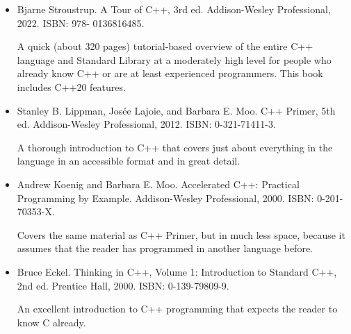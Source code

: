 \begin{itemize}
\item
Bjarne Stroustrup. A Tour of C++, 3rd ed. Addison-Wesley Professional, 2022. ISBN: 978- 0136816485.

A quick (about 320 pages) tutorial-based overview of the entire C++ language and Standard Library at a moderately high level for people who already know C++ or are at least experienced programmers. This book includes C++20 features.

\item
Stanley B. Lippman, Josée Lajoie, and Barbara E. Moo. C++ Primer, 5th ed. Addison-Wesley Professional, 2012. ISBN: 0-321-71411-3.

A thorough introduction to C++ that covers just about everything in the language in an accessible format and in great detail.

\item
Andrew Koenig and Barbara E. Moo. Accelerated C++: Practical Programming by Example. Addison-Wesley Professional, 2000. ISBN: 0-201-70353-X.

Covers the same material as C++ Primer, but in much less space, because it assumes that the reader has programmed in another language before.

\item
Bruce Eckel. Thinking in C++, Volume 1: Introduction to Standard C++, 2nd ed. Prentice Hall, 2000. ISBN: 0-139-79809-9.

An excellent introduction to C++ programming that expects the reader to know C already.
\end{itemize}


